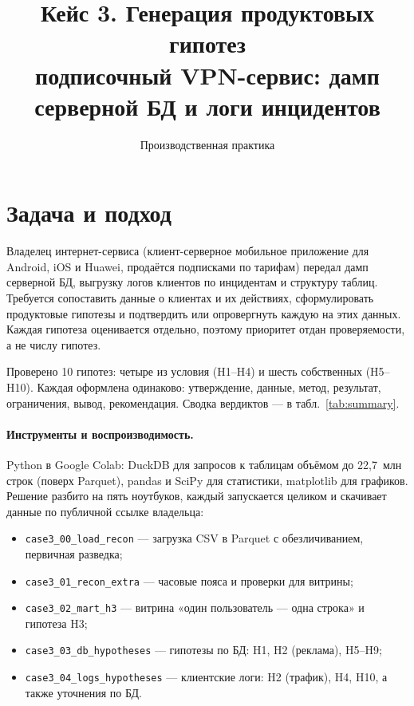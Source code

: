 \documentclass[11pt,a4paper]{article}
\title{Кейс 3. Генерация продуктовых гипотез\\[2pt]\large подписочный VPN-сервис: дамп серверной БД и логи инцидентов}
\author{Производственная практика}
\date{}
\begin{document}
\maketitle
\tableofcontents
\newpage

\section{Задача и подход}

Владелец интернет-сервиса (клиент-серверное мобильное приложение для Android, iOS и Huawei, продаётся подписками по тарифам) передал дамп серверной БД, выгрузку логов клиентов по инцидентам и структуру таблиц. Требуется сопоставить данные о клиентах и их действиях, сформулировать продуктовые гипотезы и подтвердить или опровергнуть каждую на этих данных. Каждая гипотеза оценивается отдельно, поэтому приоритет отдан проверяемости, а не числу гипотез.

Проверено 10 гипотез: четыре из условия (H1--H4) и шесть собственных (H5--H10). Каждая оформлена одинаково: утверждение, данные, метод, результат, ограничения, вывод, рекомендация. Сводка вердиктов --- в табл.~\ref{tab:summary}.

\paragraph{Инструменты и воспроизводимость.} Python в Google Colab: DuckDB для запросов к таблицам объёмом до 22,7~млн строк (поверх Parquet), pandas и SciPy для статистики, matplotlib для графиков. Решение разбито на пять ноутбуков, каждый запускается целиком и скачивает данные по публичной ссылке владельца:
\begin{itemize}
  \item \texttt{case3\_00\_load\_recon} --- загрузка CSV в Parquet с обезличиванием, первичная разведка;
  \item \texttt{case3\_01\_recon\_extra} --- часовые пояса и проверки для витрины;
  \item \texttt{case3\_02\_mart\_h3} --- витрина «один пользователь --- одна строка» и гипотеза H3;
  \item \texttt{case3\_03\_db\_hypotheses} --- гипотезы по БД: H1, H2 (реклама), H5--H9;
  \item \texttt{case3\_04\_logs\_hypotheses} --- клиентские логи: H2 (трафик), H4, H10, а также уточнения по БД.
\end{itemize}
\end{document}
